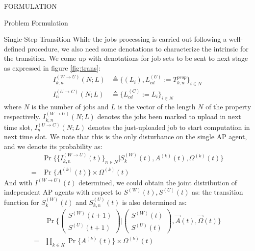 \documentclass[10pt, conference, letterpaper]{IEEEtran}
\begin{document}
\begin{section}{FORMULATION}
\begin{subsection}{Problem Formulation}
\begin{subsubsection}{Single-Step Transition}
                While the jobs processing is carried out following a well-defined procedure, we also need some denotations to characterize the intrinsic for the transition. We come up with denotations for job sets to be sent to next stage as expressed in figure \ref{fig:trans}:
                \begin{align}
                    I^{(W \to U)}_{k,n}(N;L) &\triangleq \{ (L_i),L^{(U)}_{cd}:=T^{prop}_{k,n} \}_{i \in N}
                    \\
                    I^{(U \to C)}_{n}(N;L) &\triangleq \{ L^{(C)}_{cd}:=L_i \}_{i \in N}
                \end{align}
                where $N$ is the number of jobs and $L$ is the vector of the length $N$ of the property respectively. $I^{(W \to U)}_{k,n}(N;L)$ denotes the jobs been marked to upload in next time slot, $I^{(U \to C)}_{n}(N;L)$ denotes the just-uploaded job to start computation in next time slot. We note that this is the only disturbance on the single AP agent, and we denote its probability as:
                \begin{align}
                    & \Pr\{ \{I^{(W \to U)}_{k,n}(t)\}_{n \in N} | S_{k}^{(W)}(t), A^{(k)}(t), \Omega^{(k)}(t) \} \nonumber\\
                    = & \Pr\{ A^{(k)}(t) \} \times \Omega^{(k)}(t)
                \end{align}
                And with $I^{(W \to U)}(t)$ determined, we could obtain the joint distribution of independent AP agents with respect to $S^{(W)}(t),S^{(U)}(t)$ as:
                the transition function for $S^{(W)}_{k}(t)$ and $S^{(U)}_{k,n}(t)$ is also determined as:
                \begin{align}
                    & \Pr\{
                        \begin{pmatrix}
                            S^{(W)}(t+1) \\ S^{(U)}(t+1)
                        \end{pmatrix}
                        |
                        \begin{pmatrix}
                            S^{(W)}(t) \\ S^{(U)}(t)
                        \end{pmatrix}, \vec{A}(t), \vec{\Omega}(t)
                    \}
                    \nonumber\\
                    = & \prod_{k \in K} \Pr\{ A^{(k)}(t) \} \times \Omega^{(k)}(t)
                \end{align}


\end{subsubsection}
\end{subsection}
\end{section}
\end{document}
